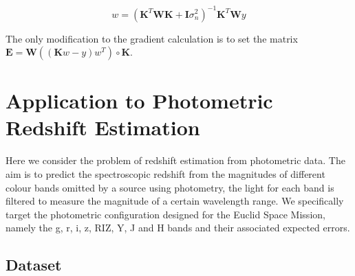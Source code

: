 \documentclass[useAMS,usenatbib,fleqn]{mn2e}
\newcommand{\bm}[1]{\mathbf{#1} }
\begin{document}
\begin{equation}
\label{eq-weighted-linear-regression-objective-rectangular}
w = \left(\bm{K}^{T}\bm{WK}+\bm{I}\sigma_{n}^{2} \right)^{-1}\bm{K}^{T}\bm{W}y
\end{equation}

The only modification to the gradient calculation is to set the matrix $\bm{E}=\bm{W}\left(\left(\bm{K}w-y\right)w^{T}\right)\circ\bm{K}$.

\section{Application to Photometric Redshift Estimation}
\label{sec-application}

Here we consider the problem of redshift estimation from photometric data. The aim is to predict the spectroscopic redshift from the magnitudes of different colour bands omitted by a source using photometry, the light for each band is filtered to measure the magnitude of a certain wavelength range. We specifically target the photometric configuration designed for the Euclid Space Mission, namely the g, r, i, z, RIZ, Y, J and H bands and their associated expected errors. 

\subsection{Dataset}
\label{sec-dataset}
\end{document}
